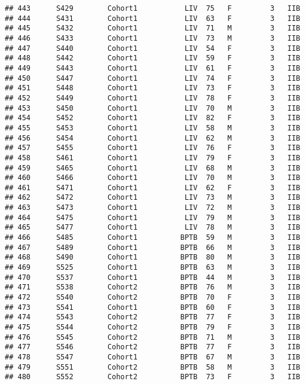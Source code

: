 \documentclass[
]{article}
\begin{document}
\begin{verbatim}
## 443      S429        Cohort1           LIV  75   F         3   IIB
## 444      S431        Cohort1           LIV  63   F         3   IIB
## 445      S432        Cohort1           LIV  71   M         3   IIB
## 446      S433        Cohort1           LIV  73   M         3   IIB
## 447      S440        Cohort1           LIV  54   F         3   IIB
## 448      S442        Cohort1           LIV  59   F         3   IIB
## 449      S443        Cohort1           LIV  61   F         3   IIB
## 450      S447        Cohort1           LIV  74   F         3   IIB
## 451      S448        Cohort1           LIV  73   F         3   IIB
## 452      S449        Cohort1           LIV  78   F         3   IIB
## 453      S450        Cohort1           LIV  70   M         3   IIB
## 454      S452        Cohort1           LIV  82   F         3   IIB
## 455      S453        Cohort1           LIV  58   M         3   IIB
## 456      S454        Cohort1           LIV  62   M         3   IIB
## 457      S455        Cohort1           LIV  76   F         3   IIB
## 458      S461        Cohort1           LIV  79   F         3   IIB
## 459      S465        Cohort1           LIV  68   M         3   IIB
## 460      S466        Cohort1           LIV  70   M         3   IIB
## 461      S471        Cohort1           LIV  62   F         3   IIB
## 462      S472        Cohort1           LIV  73   M         3   IIB
## 463      S473        Cohort1           LIV  72   M         3   IIB
## 464      S475        Cohort1           LIV  79   M         3   IIB
## 465      S477        Cohort1           LIV  78   M         3   IIB
## 466      S485        Cohort1          BPTB  59   M         3   IIB
## 467      S489        Cohort1          BPTB  66   M         3   IIB
## 468      S490        Cohort1          BPTB  80   M         3   IIB
## 469      S525        Cohort1          BPTB  63   M         3   IIB
## 470      S537        Cohort1          BPTB  44   M         3   IIB
## 471      S538        Cohort2          BPTB  76   M         3   IIB
## 472      S540        Cohort2          BPTB  70   F         3   IIB
## 473      S541        Cohort1          BPTB  60   F         3   IIB
## 474      S543        Cohort2          BPTB  77   F         3   IIB
## 475      S544        Cohort2          BPTB  79   F         3   IIB
## 476      S545        Cohort2          BPTB  71   M         3   IIB
## 477      S546        Cohort2          BPTB  77   F         3   IIB
## 478      S547        Cohort1          BPTB  67   M         3   IIB
## 479      S551        Cohort2          BPTB  58   M         3   IIB
## 480      S552        Cohort2          BPTB  73   F         3   IIB

\end{verbatim}
\end{document}
